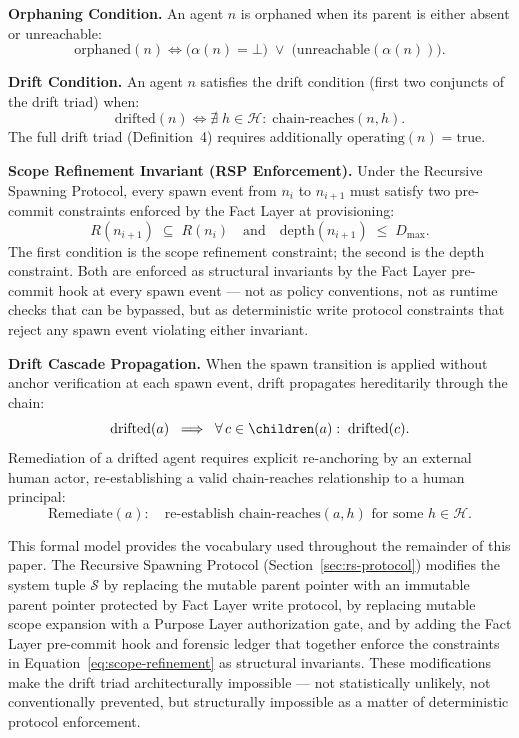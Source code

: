 \medskip
\noindent\textbf{Orphaning Condition.}
An agent $n$ is orphaned when its parent is either absent or unreachable:
\begin{equation}
\text{orphaned}(n) \iff \bigl( \alpha(n) = \bot \bigr)\;\lor\;\bigl( \text{unreachable}(\alpha(n)) \bigr).
\label{eq:orphaned}
\end{equation}

\medskip
\noindent\textbf{Drift Condition.}
An agent $n$ satisfies the drift condition (first two conjuncts of the drift triad) when:
\begin{equation}
\text{drifted}(n) \iff \nexists\; h \in \mathcal{H}:\; \text{chain-reaches}(n, h).
\label{eq:drift-condition}
\end{equation}
The full drift triad (Definition~4) requires additionally $\text{operating}(n) = \text{true}$.

\medskip
\noindent\textbf{Scope Refinement Invariant (RSP Enforcement).}
Under the Recursive Spawning Protocol, every spawn event from $n_i$ to $n_{i+1}$ must satisfy two pre-commit constraints enforced by the Fact Layer at provisioning:
\begin{equation}
R(n_{i+1}) \;\subseteq\; R(n_i) \quad\text{and}\quad \text{depth}(n_{i+1}) \;\leq\; D_{\max}.
\label{eq:scope-refinement}
\end{equation}
The first condition is the scope refinement constraint; the second is the depth constraint. Both are enforced as structural invariants by the Fact Layer pre-commit hook at every spawn event — not as policy conventions, not as runtime checks that can be bypassed, but as deterministic write protocol constraints that reject any spawn event violating either invariant.

\medskip
\noindent\textbf{Drift Cascade Propagation.}
When the spawn transition is applied without anchor verification at each spawn event, drift propagates hereditarily through the chain:
\begin{equation}
\text{drifted}(a) \;\implies\; \forall\, c \in \children(a):\; \text{drifted}(c).
\label{eq:drift-propagation}
\end{equation}
Remediation of a drifted agent requires explicit re-anchoring by an external human actor, re-establishing a valid chain-reaches relationship to a human principal:
\begin{equation}
\text{Remediate}(a):\quad \text{re-establish }\text{chain-reaches}(a, h) \text{ for some } h \in \mathcal{H}.
\label{eq:drift-remediation}
\end{equation}

This formal model provides the vocabulary used throughout the remainder of this paper. The Recursive Spawning Protocol (Section~\ref{sec:rs-protocol}) modifies the system tuple $\mathcal{S}$ by replacing the mutable parent pointer with an immutable parent pointer protected by Fact Layer write protocol, by replacing mutable scope expansion with a Purpose Layer authorization gate, and by adding the Fact Layer pre-commit hook and forensic ledger that together enforce the constraints in Equation~\ref{eq:scope-refinement} as structural invariants. These modifications make the drift triad architecturally impossible — not statistically unlikely, not conventionally prevented, but structurally impossible as a matter of deterministic protocol enforcement.